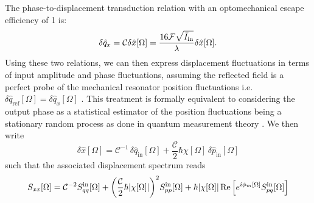 The phase-to-displacement transduction relation with an optomechanical escape efficiency of 1 is:
\begin{equation*}
   \delta \hat q_x = \mathcal{C} \delta \hat x [\Omega] = \frac{16 \mathcal{F}\sqrt{\bar I_{\rm in}}}{\lambda}\delta \hat{x}[\Omega].
\end{equation*}
Using these two relations, we can then express displacement fluctuations in terms of input amplitude and phase fluctuations, assuming the reflected field is a perfect probe of the mechanical resonator position fluctuations i.e. $\delta \hat q_{\mathrm{ref}}[\Omega] = \delta \hat q_x[\Omega]$ \cite{Jaekel1990}. This treatment is formally equivalent to considering the output phase as a statistical estimator of the position fluctuations being a stationary random process as done in quantum measurement theory \cite{clerk_introduction_2010}. We then write
\begin{equation}
  \delta \hat{x}[\Omega] =\mathcal{C}^{-1} \, \delta \hat{q}_{\mathrm{in}}[\Omega]  + \dfrac{\mathcal{C} }{2} \hbar \chi[\Omega] \, \delta \hat{p}_{\mathrm{in}}[\Omega]
\end{equation}
such that the associated displacement spectrum reads
\begin{equation}
      S_{xx}[\Omega] = \mathcal{C}^{-2} S_{qq}^{\rm in}[\Omega] + \bigg(\dfrac{\mathcal{C} }{2} \hbar |\chi[\Omega]| \bigg)^2 S_{pp}^{\rm in}[\Omega]   + \hbar |\chi[\Omega]| \Re\Big[  e^{i\phi_m[\Omega]} S_{pq}^{\rm in}[\Omega]\Big]
  \label{eq:total_displacement_spectrum}
\end{equation}

